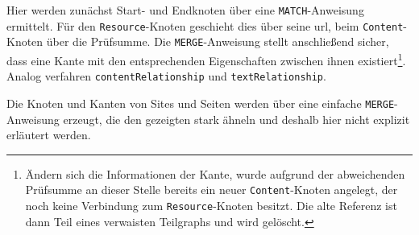     Hier werden zunächst Start- und Endknoten über eine \texttt{MATCH}-Anweisung ermittelt.
    Für den \texttt{Resource}-Knoten geschieht dies über seine \gls{url},
    beim \texttt{Content}-Knoten über die Prüfsumme.
    Die \texttt{MERGE}-Anweisung stellt anschließend sicher,
    dass eine Kante mit den entsprechenden Eigenschaften zwischen ihnen
    existiert\footnote{Ändern sich die Informationen der Kante, wurde aufgrund der abweichenden
    Prüfsumme an dieser Stelle bereits ein neuer \texttt{Content}-Knoten angelegt,
    der noch keine Verbindung zum \texttt{Resource}-Knoten besitzt.
    Die alte Referenz ist dann Teil eines verwaisten Teilgraphs und wird gelöscht.}.
    Analog verfahren \texttt{contentRelationship} und \texttt{textRelationship}.

    Die Knoten und Kanten von Sites und Seiten werden über eine einfache \texttt{MERGE}-Anweisung erzeugt,
    die den gezeigten stark ähneln und deshalb hier nicht explizit erläutert werden.
